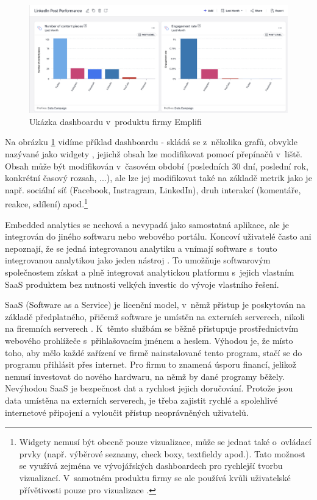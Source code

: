 \documentclass[czech, bc, kiv, he, iso690numb]{fasthesis}
\begin{document}
\begin{figure}
	\centering
	\includegraphics[width=1\textwidth]{pictures/emplifi-dashboard-example-kopie.png}
	\caption{Ukázka dashboardu v~produktu firmy Emplifi \cite{emplifidashboardIMAGE}}
	\label{fig:emplifiDashUkazka}
\end{figure}

Na obrázku \ref{fig:emplifiDashUkazka} vidíme příklad dashboardu - skládá se z~několika grafů, obvykle nazývané jako widgety \cite{emplifiDashboard}, jejichž obsah lze modifikovat pomocí přepínačů v~liště. Obsah může být modifikován v~časovém období (posledních 30 dní, poslední rok, konkrétní časový rozsah, ...), ale lze jej modifikovat také na základě metrik jako je např. sociální síť (Facebook, Instragram, LinkedIn), druh interakcí (komentáře, reakce, sdílení) apod.\footnote{Widgety nemusí být obecně pouze vizualizace, může se jednat také o~ovládací prvky (např. výběrové seznamy, check boxy, textfieldy apod.). Tato možnost se využívá zejména ve vývojářských dashboardech pro rychlejší tvorbu vizualizací. V~samotném produktu firmy se ale používá kvůli uživatelské přívětivosti pouze pro vizualizace \cite{emplifiDashboard}. 
}

Embedded analytics se nechová a nevypadá jako samostatná aplikace, ale je integrován do jiného softwaru nebo webového portálu. Koncoví uživatelé často ani nepoznají, že se jedná
integrovanou analytiku a vnímají software s~touto integrovanou analytikou jako jeden nástroj \cite{goodDataEmbedded}. To umožňuje softwarovým společnostem získat a plně
integrovat analytickou platformu s~jejich vlastním SaaS produktem bez nutnosti velkých investic do vývoje vlastního řešení. 

SaaS (Software as a Service) je licenční model, v~němž přístup je poskytován na základě předplatného, přičemž software je umístěn na externích serverech, nikoli na firemních serverech \cite{saasDefinition}.
K~těmto službám se běžně přistupuje prostřednictvím webového prohlížeče s~přihlašovacím jménem a heslem. Výhodou je, že místo toho, aby mělo každé zařízení ve firmě nainstalované
tento program, stačí se do programu přihlásit přes internet. Pro firmu to znamená úsporu financí, jelikož nemusí investovat do nového hardwaru, na němž by dané programy běžely. 
Nevýhodou SaaS je bezpečnost dat a rychlost jejich doručování. Protože jsou data umístěna na externích serverech, je třeba zajistit rychlé a spolehlivé internetové připojení a vyloučit
přístup neoprávněných uživatelů.
\end{document}
